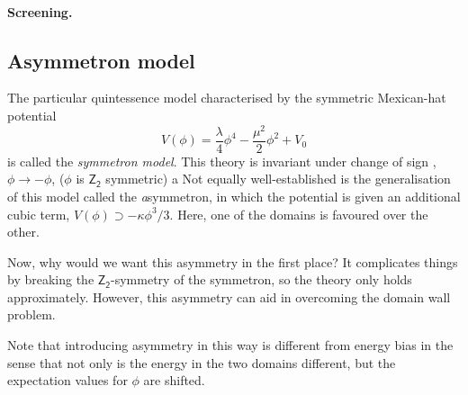 

    \paragraph{Screening.} %





    \subsection{Asymmetron model}\label{sec:cosmo:quintessence:asymmetron}
    The particular quintessence model characterised by the symmetric Mexican-hat potential
    \begin{equation}
        V(\phi) = \frac{\lambda}{4} \phi^4  - \frac{\mu^2}{2} \phi^2 + V_0
    \end{equation}
    is called the \emph{symmetron model}. This theory is invariant under change of sign , $\phi\to -\phi$, ($\phi$ is $\mathsf{Z_2}$ symmetric) a  %
    Not equally well-established is the generalisation of this model called the \emph{a}symmetron, in which the potential is given an additional cubic term, $V(\phi)\supset -\kappa\phi^3/3 $. Here, one of the domains is favoured over the other.

    Now, why would we want this asymmetry in the first place? It complicates things by breaking the $\mathsf{Z_2}$-symmetry of the symmetron, so the theory only holds approximately. However, this asymmetry can aid in overcoming the domain wall problem. 

    Note that introducing asymmetry in this way is different from energy bias in the sense that not only is the energy in the two domains different, but the expectation values for $\phi$ are shifted.


